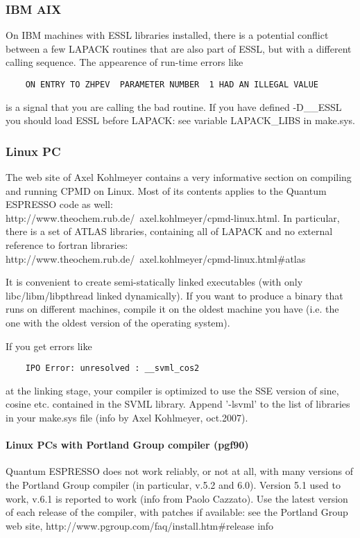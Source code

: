\documentclass[12pt,a4paper]{article}
\begin{document}
\subsubsection{IBM AIX}
On IBM machines with ESSL libraries installed, there is a 
potential conflict between a few LAPACK routines that are also part of ESSL, 
but with a different calling sequence. The appearence of run-time errors like
\begin{verbatim}
    ON ENTRY TO ZHPEV  PARAMETER NUMBER  1 HAD AN ILLEGAL VALUE
\end{verbatim}
is a signal that you are calling the bad routine. If you have deﬁned 
-D\_\_ESSL you should load ESSL before LAPACK: see variable
LAPACK\_LIBS in make.sys.

\subsubsection{Linux PC}
The web site of Axel Kohlmeyer contains a very informative
section on compiling and running CPMD on Linux. Most of its contents
applies to the Quantum ESPRESSO code as well:\\
http://www.theochem.rub.de/~axel.kohlmeyer/cpmd-linux.html. In
particular, there is a set of ATLAS libraries, containing all of
LAPACK and no external reference to fortran libraries:\\
http://www.theochem.rub.de/~axel.kohlmeyer/cpmd-linux.html\#atlas 
    
It is convenient to create semi-statically linked executables (with only
libc/libm/libpthread linked dynamically). If you want to produce a binary
that runs on different machines, compile it on the oldest machine you have
(i.e. the one with the oldest version of the operating system).

If you get errors like 
\begin{verbatim}
    IPO Error: unresolved : __svml_cos2
\end{verbatim}
at the linking stage, your compiler is optimized to use the SSE
version of sine, cosine etc. contained in the SVML library. Append
'-lsvml' to the list of libraries in your make.sys file (info by Axel
Kohlmeyer, oct.2007). 

\paragraph{Linux PCs with Portland Group compiler (pgf90)}
Quantum ESPRESSO does not work reliably, or not at all, with many
versions of the Portland Group compiler (in particular, v.5.2 and
6.0). Version 5.1 used to work, v.6.1 is reported to work (info from
Paolo Cazzato). Use the latest version of each release of the
compiler, with patches if available: 
see the Portland Group web site,
http://www.pgroup.com/faq/install.htm\#release info
\end{document}
